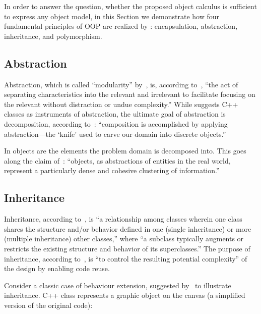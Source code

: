 
In order to answer the question, whether
the proposed object calculus is sufficient
to express any object model, in this Section we demonstrate
how four fundamental principles of OOP are realized by \phic{}:
encapsulation, abstraction, inheritance, and polymorphism.

\subsection{Abstraction}

Abstraction, which is called ``modularity'' by~\citet{grady2007object}, is,
according to~\citet[p.203]{west2004object},
``the act of separating characteristics into the relevant and
irrelevant to facilitate focusing on the relevant without
distraction or undue complexity.'' While \citet{stroustrup1997} suggests
C++ classes as instruments of abstraction, the ultimate goal
of abstraction is decomposition, according to~\citet[p.73]{west2004object}:
``composition is accomplished by applying abstraction---the
`knife' used to carve our domain into discrete objects.''

In \phic{} objects are the elements the problem domain
is decomposed into.
This goes along the claim of~\citet[p.24]{west2004object}:
``objects, as abstractions of entities in the real world,
represent a particularly dense and cohesive clustering of information.''


\subsection{Inheritance}

Inheritance, according to~\citet{grady2007object}, is
``a relationship among classes wherein one class shares the structure
and/or behavior defined in one (single inheritance)
or more (multiple inheritance) other classes,'' where
``a subclass typically augments or
restricts the existing structure and behavior of its superclasses.''
The purpose of inheritance, according to~\citet{meyer1997object}, is
``to control the resulting potential complexity'' of the design
by enabling code reuse.

Consider a classic case of behaviour extension, suggested by~\citet[p.38]{stroustrup1997}
to illustrate inheritance. C++ class  represents a graphic object
on the canvas (a simplified version of the original code):

